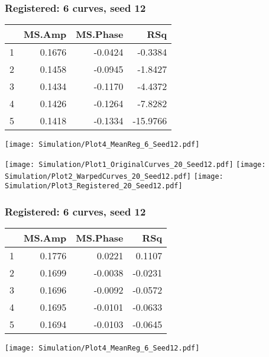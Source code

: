 \documentclass[10pt,dvipsnames,table]{beamer}
\begin{document}
\begin{frame}
\frametitle{Registered: 6 curves, seed 12}
\begin{table}[ht]
\footnotesize
\centering
\begin{tabular}{rrrr}
  \hline
 & MS.Amp & MS.Phase & RSq \\ 
  \hline
1 & 0.1676 & -0.0424 & -0.3384 \\ 
  2 & 0.1458 & -0.0945 & -1.8427 \\ 
  3 & 0.1434 & -0.1170 & -4.4372 \\ 
  4 & 0.1426 & -0.1264 & -7.8282 \\ 
  5 & 0.1418 & -0.1334 & -15.9766 \\ 
   \hline
\end{tabular}
\end{table}

\begin{center}
\texttt{[image: Simulation/Plot4\_MeanReg\_6\_Seed12.pdf]} 
\end{center}
\end{frame}

\begin{frame}
\begin{center}
\texttt{[image: Simulation/Plot1\_OriginalCurves\_20\_Seed12.pdf]} 
\texttt{[image: Simulation/Plot2\_WarpedCurves\_20\_Seed12.pdf]} 
\newline
\texttt{[image: Simulation/Plot3\_Registered\_20\_Seed12.pdf]} 
\end{center}
\end{frame}

\begin{frame}
\frametitle{Registered: 6 curves, seed 12}
\begin{table}[ht]
\footnotesize
\centering
\begin{tabular}{rrrr}
  \hline
 & MS.Amp & MS.Phase & RSq \\ 
  \hline
1 & 0.1776 & 0.0221 & 0.1107 \\ 
  2 & 0.1699 & -0.0038 & -0.0231 \\ 
  3 & 0.1696 & -0.0092 & -0.0572 \\ 
  4 & 0.1695 & -0.0101 & -0.0633 \\ 
  5 & 0.1694 & -0.0103 & -0.0645 \\ 
   \hline
\end{tabular}
\end{table}

\begin{center}
\texttt{[image: Simulation/Plot4\_MeanReg\_6\_Seed12.pdf]} 
\end{center}
\end{frame}
\end{document}

